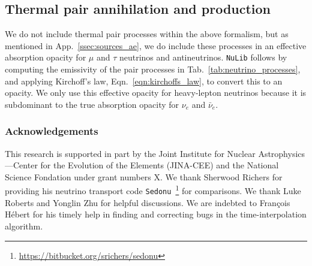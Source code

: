 \documentclass[aps,floatfix,prd,superscriptaddress,twocolumn]{revtex4-1}
\newcommand{\todo}[1]{\marginpar{\tiny{\textcolor{red}{#1}}}}
\begin{document}
\subsection{Thermal pair annihilation and production}
\label{ssec:sources_pp}
We do not include thermal pair processes within the above formalism,
but as mentioned in App.~\ref{ssec:sources_ae}, we do include
these processes in an effective absorption opacity for $\mu$ and $\tau$
neutrinos and antineutrinos. \lstinline{NuLib} follows
\cite{brue1985-core_collapse,burr2006-neutrino_opacities}
by computing the emissivity of the pair processes in
\todo{describe better}
Tab.~\ref{tab:neutrino_processes}, and applying Kirchoff's law,
Eqn.~\ref{eqn:kirchoffs_law}, to convert this to an opacity.
We only use this effective opacity for heavy-lepton neutrinos because
it is subdominant to the true absorption opacity for
$\nu_e$ and $\bar{\nu}_e$.

\subsubsection*{Acknowledgements}
This research is supported in part by the Joint Institute for Nuclear
Astrophysics---Center for the Evolution of the Elements (JINA-CEE)
and the National Science Fondation under grant numbers X. \todo{grant nos?}
We thank Sherwood Richers for providing his neutrino transport code
\lstinline{Sedonu}~\footnote{\url{https://bitbucket.org/srichers/sedonu}}
for comparisons.
We thank Luke Roberts and Yonglin Zhu for helpful discussions.
We are indebted to Fran\c{c}ois H\'{e}bert for his timely help in finding and
correcting bugs in the time-interpolation algorithm.


\end{document}

